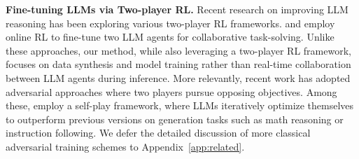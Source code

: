 \noindent\textbf{Fine-tuning LLMs via Two-player RL.} 
Recent research on improving LLM reasoning has been exploring various two-player RL frameworks. \citet{zhou2024reflect} and \citet{ma2024coevolving} employ online RL to fine-tune two LLM agents for collaborative task-solving.  
Unlike these approaches, our method, while also leveraging a two-player RL framework, focuses on data synthesis and model training rather than real-time collaboration between LLM agents during inference.  
More relevantly, recent work has adopted adversarial approaches where two players pursue opposing objectives. Among these, \citet{cheng2024self, chen2024self, wu2024self, munos2023nash, swamy2024minimaximalist} employ a self-play framework, where LLMs iteratively optimize themselves to outperform previous versions on generation tasks such as math reasoning or instruction following. We defer the detailed discussion of more classical adversarial training schemes to Appendix~\ref{app:related}.
